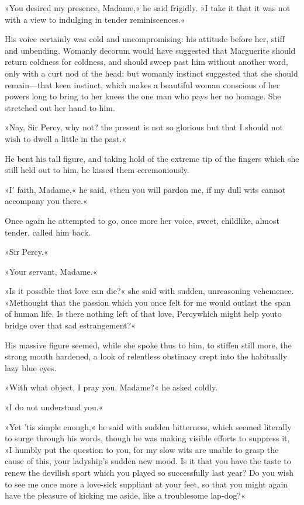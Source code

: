 »You desired my presence, Madame,« he said frigidly. »I take it that it was not with a view to indulging in tender reminiscences.«

His voice certainly was cold and uncompromising: his attitude before her, stiff and unbending. Womanly decorum would have suggested that Marguerite should return coldness for coldness, and should sweep past him without another word, only with a curt nod of the head: but womanly instinct suggested that she should remain—that keen instinct, which makes a beautiful woman conscious of her powers long to bring to her knees the one man who pays her no homage. She stretched out her hand to him.

»Nay, Sir Percy, why not? the present is not so glorious but that I should not wish to dwell a little in the past.«

He bent his tall figure, and taking hold of the extreme tip of the fingers which she still held out to him, he kissed them ceremoniously.

»I' faith, Madame,« he said, »then you will pardon me, if my dull wits cannot accompany you there.«

Once again he attempted to go, once more her voice, sweet, childlike, almost tender, called him back.

»Sir Percy.«

»Your servant, Madame.«

»Is it possible that love can die?« she said with sudden, unreasoning vehemence. »Methought that the passion which you once felt for me would outlast the span of human life. Is there nothing left of that love, Percy\textellipsis \allowbreak  which might help you\textellipsis \allowbreak  to bridge over that sad estrangement?«

His massive figure seemed, while she spoke thus to him, to stiffen still more, the strong mouth hardened, a look of relentless obstinacy crept into the habitually lazy blue eyes.

»With what object, I pray you, Madame?« he asked coldly.

»I do not understand you.«

»Yet 'tis simple enough,« he said with sudden bitterness, which seemed literally to surge through his words, though he was making visible efforts to suppress it, »I humbly put the question to you, for my slow wits are unable to grasp the cause of this, your ladyship's sudden new mood. Is it that you have the taste to renew the devilish sport which you played so successfully last year? Do you wish to see me once more a love-sick suppliant at your feet, so that you might again have the pleasure of kicking me aside, like a troublesome lap-dog?«

